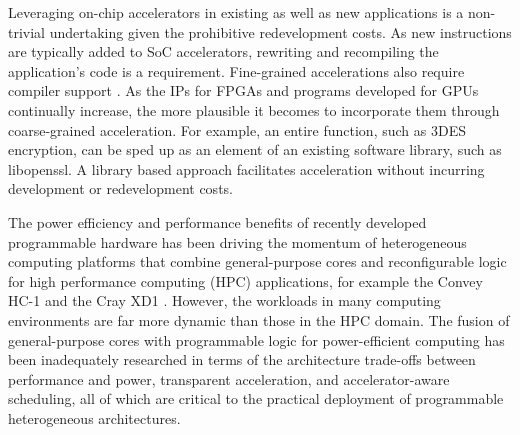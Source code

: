 Leveraging on-chip accelerators in existing as well as new applications is a
non-trivial undertaking given the prohibitive redevelopment costs.  
As new instructions are typically added to SoC
accelerators, rewriting and recompiling the application's code is
a requirement. Fine-grained accelerations also require compiler support \cite{Govindaraju:2012fn}. As the IPs for
FPGAs and programs developed for GPUs continually increase, the more plausible it becomes
to incorporate them through coarse-grained acceleration.  For example, an entire function, such as 3DES encryption,
can be sped up as an element of an existing software library, such as libopenssl. A library based
approach facilitates acceleration without incurring development or redevelopment costs. 

The power efficiency \cite{hamada09,thomas09} and performance benefits
of recently developed programmable hardware has been driving the momentum of
heterogeneous computing platforms that combine general-purpose cores
and reconfigurable logic for high performance computing (HPC) applications, 
for example the Convey HC-1 \cite{brewer09} and the Cray XD1 \cite{Ulmer:2005vh}.
However, the workloads in many computing environments
are far more dynamic than those in the HPC domain. The
fusion of general-purpose cores with programmable logic for
power-efficient computing has been inadequately researched in terms of
the architecture trade-offs between performance and power, transparent
acceleration, and accelerator-aware scheduling, all of which are
critical to the practical deployment of programmable heterogeneous
architectures.

